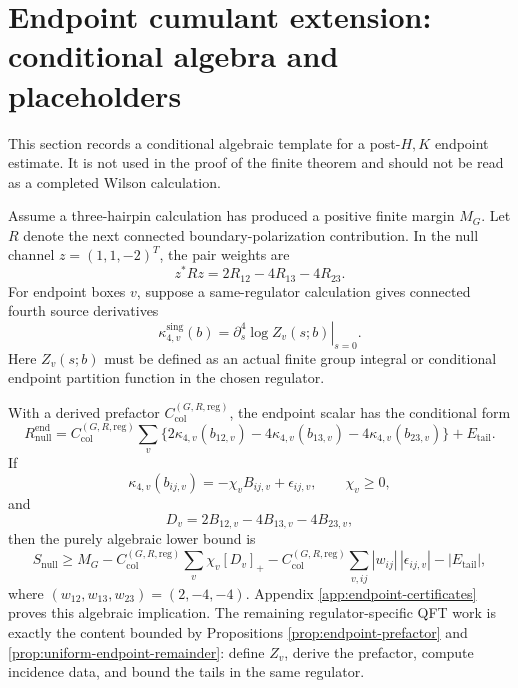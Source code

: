 \documentclass[11pt]{article}
\newcommand{\snull}{S_{\mathrm{null}}}
\begin{document}
\section{Endpoint cumulant extension: conditional algebra and placeholders}
\label{sec:endpoint-extension}

This section records a conditional algebraic template for a post-\(H,K\) endpoint estimate.  It is not used in the proof of the finite theorem and should not be read as a completed Wilson calculation.

Assume a three-hairpin calculation has produced a positive finite margin \(M_G\).  Let \(R\) denote the next connected boundary-polarization contribution.  In the null channel \(z=(1,1,-2)^T\), the pair weights are
\begin{equation}
  z^*Rz=2R_{12}-4R_{13}-4R_{23}.
  \label{eq:null-weights}
\end{equation}
For endpoint boxes \(v\), suppose a same-regulator calculation gives connected fourth source derivatives
\begin{equation}
  \kappa_{4,v}^{\mathrm{sing}}(b)
  =\left.\partial_s^4\log Z_v(s;b)\right|_{s=0}.
  \label{eq:kappa4}
\end{equation}
Here \(Z_v(s;b)\) must be defined as an actual finite group integral or conditional endpoint partition function in the chosen regulator.

With a derived prefactor \(C_{\mathrm{col}}^{(G,R,\mathrm{reg})}\), the endpoint scalar has the conditional form
\begin{equation}
  R_{\mathrm{null}}^{\mathrm{end}}
  =C_{\mathrm{col}}^{(G,R,\mathrm{reg})}
  \sum_v
  \{2\kappa_{4,v}(b_{12,v})-4\kappa_{4,v}(b_{13,v})-4\kappa_{4,v}(b_{23,v})\}
  +E_{\mathrm{tail}}.
  \label{eq:endpoint-scalar}
\end{equation}
If
\begin{equation}
  \kappa_{4,v}(b_{ij,v})=-\chi_v B_{ij,v}+\epsilon_{ij,v},
  \qquad \chi_v\ge0,
  \label{eq:kappa-expansion}
\end{equation}
and
\begin{equation}
  D_v=2B_{12,v}-4B_{13,v}-4B_{23,v},
  \label{eq:Dv}
\end{equation}
then the purely algebraic lower bound is
\begin{equation}
  \snull
  \ge
  M_G
  -C_{\mathrm{col}}^{(G,R,\mathrm{reg})}\sum_v\chi_v[D_v]_+
  -C_{\mathrm{col}}^{(G,R,\mathrm{reg})}\sum_{v,ij}|w_{ij}|\,|\epsilon_{ij,v}|
  -|E_{\mathrm{tail}}|,
  \label{eq:safe-endpoint-bound}
\end{equation}
where \((w_{12},w_{13},w_{23})=(2,-4,-4)\).  Appendix \ref{app:endpoint-certificates} proves this algebraic implication.  The remaining regulator-specific QFT work is exactly the content bounded by Propositions \ref{prop:endpoint-prefactor} and \ref{prop:uniform-endpoint-remainder}: define \(Z_v\), derive the prefactor, compute incidence data, and bound the tails in the same regulator.
\end{document}
